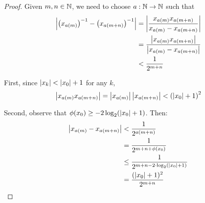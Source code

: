 \documentclass[leqno]{report}
\begin{document}
\begin{proof}
    Given $m, n \in \mathbb{N}$, we need to choose $a : \mathbb{N} \rightarrow \mathbb{N}$ such that
    \begin{align*}
        \left| \left(x_{a(m)}\right)^{-1} - \left(x_{a(m+n)}\right)^{-1} \right|
        &= \left| \frac{x_{a(m)} x_{a(m+n)}}{x_{a(m)} - x_{a(m+n)}} \right| \\
        &= \frac{\left| x_{a(m)} x_{a(m+n)} \right|}{\left| x_{a(m)} - x_{a(m+n)} \right|} \\
        &< \frac{1}{2^{m+n}}
    \end{align*}

    First, since $\left| x_k \right| < \left| x_0 \right| + 1$ for any $k$,
    \[ \left| x_{a(m)} x_{a(m+n)} \right| = \left| x_{a(m)} \right| \left| x_{a(m+n)} \right| < \left(\left| x_0 \right| + 1\right)^2 \]

    Second, observe that $\phi(x_0) \geq -2 \log_2(\left| x_0 \right| + 1)$. Then:
    \begin{align*}
        \left| x_{a(m)} - x_{a(m+n)} \right|
        &< \frac{1}{2^{a(m+n)}} \\
        &= \frac{1}{2^{m + n + \phi(x_0)}} \\
        &\leq \frac{1}{2^{m + n - 2 \cdot \log_2(\left| x_0 \right| + 1)}} \\
        &= \frac{(\left| x_0 \right| + 1)^2}{2^{m+n}}
    \end{align*}
\end{proof}



\end{document}

